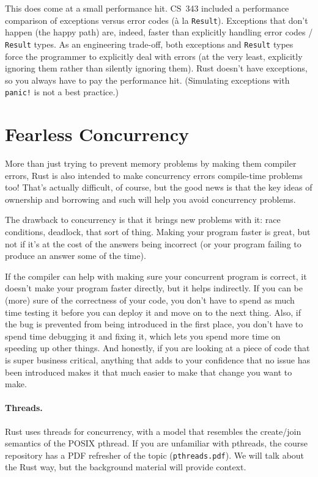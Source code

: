 \documentclass[a4paper]{report}
\begin{document}
This does come at a small performance hit. CS~343 included a performance comparison of exceptions versus error codes (\`a la \texttt{Result}). Exceptions that don't happen (the happy path) are, indeed, faster than explicitly handling error codes / \texttt{Result} types. As an engineering trade-off, both exceptions and \texttt{Result} types force the programmer to explicitly deal with errors (at the very least, explicitly ignoring them rather than silently ignoring them). Rust doesn't have exceptions, so you always have to pay the performance hit. (Simulating exceptions with \texttt{panic!} is not a best practice.)

\section*{Fearless Concurrency}
More than just trying to prevent memory problems by making them compiler errors, Rust is also intended to make concurrency errors compile-time problems too! That's actually difficult, of course, but the good news is that the key ideas of ownership and borrowing and such will help you avoid concurrency problems.

The drawback to concurrency is that it brings new problems with it: race conditions, deadlock, that sort of thing. Making your program faster is great, but not if it's at the cost of the answers being incorrect (or your program failing to produce an answer some of the time).

If the compiler can help with making sure your concurrent program is correct, it doesn't make your program faster directly, but it helps indirectly. If you can be (more) sure of the correctness of your code, you don't have to spend as much time testing it before you can deploy it and move on to the next thing. Also, if the bug is prevented from being introduced in the first place, you don't have to spend time debugging it and fixing it, which lets you spend more time on speeding up other things. And honestly, if you are looking at a piece of code that is super business critical, anything that adds to your confidence that no issue has been introduced makes it that much easier to make that change you want to make.

\paragraph{Threads.} Rust uses threads for concurrency, with a model that resembles the create/join semantics of the POSIX pthread. If you are unfamiliar with pthreads, the course repository has a PDF refresher of the topic (\texttt{pthreads.pdf}). We will talk about the Rust way, but the background material will provide context.
\end{document}
